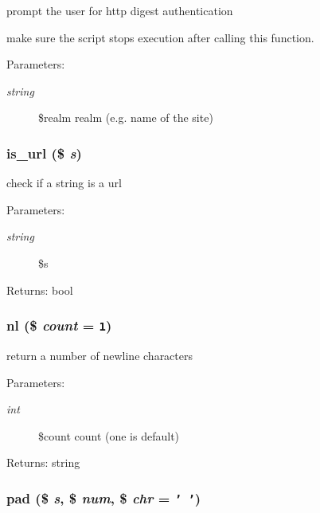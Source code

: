 prompt the user for http digest authentication

make sure the script stops execution after calling this function. \begin{Desc}
\item[Parameters:]
\begin{description}
\item[{\em string}]\$realm realm (e.g. name of the site) \end{description}
\end{Desc}
\hypertarget{util_8inc_8php_0da48011cb68c039aec396c23cb04295}{
\subsubsection[{is\_\-url}]{\setlength{\rightskip}{0pt plus 5cm}is\_\-url (\$ {\em s})}}
\label{util_8inc_8php_0da48011cb68c039aec396c23cb04295}


check if a string is a url

\begin{Desc}
\item[Parameters:]
\begin{description}
\item[{\em string}]\$s \end{description}
\end{Desc}
\begin{Desc}
\item[Returns:]bool \end{Desc}
\hypertarget{util_8inc_8php_9f9eeab2eb9a39518e80609fc7f83842}{
\subsubsection[{nl}]{\setlength{\rightskip}{0pt plus 5cm}nl (\$ {\em count} = {\tt 1})}}
\label{util_8inc_8php_9f9eeab2eb9a39518e80609fc7f83842}


return a number of newline characters

\begin{Desc}
\item[Parameters:]
\begin{description}
\item[{\em int}]\$count count (one is default) \end{description}
\end{Desc}
\begin{Desc}
\item[Returns:]string \end{Desc}
\hypertarget{util_8inc_8php_37ef346387afe0af2cf86a8bea887173}{
\subsubsection[{pad}]{\setlength{\rightskip}{0pt plus 5cm}pad (\$ {\em s}, \/  \$ {\em num}, \/  \$ {\em chr} = {\tt '~'})}}
\label{util_8inc_8php_37ef346387afe0af2cf86a8bea887173}



